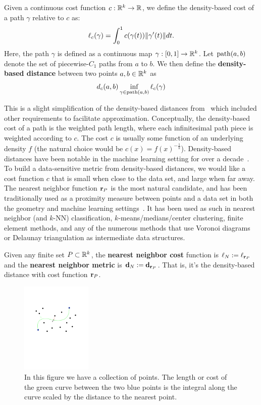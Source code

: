 \begin{definition}
Given a continuous cost function $c:\mathbb{R}^k \rightarrow \mathbb{R}$, we define the density-based
cost of a path $\gamma$ relative to $c$ as:
\[ \ell_c(\gamma) = \int_{0}^1 c(\gamma(t)) \| \gamma'(t) \|dt. \]
Here, the path $\gamma$ is defined as a continuous map $\gamma:[0,1]
\to \mathbb{R}^k$.
Let $\mathrm{path}(a,b)$ denote the set of piecewise-$C_1$ paths from $a$ to $b$.
We then define the \textbf{density-based distance} between two points $a, b \in
\mathbb{R}^k$ as
\[ d_c(a,b) \inf_{\gamma\in\mathrm{path}(a,b)} \ell_c(\gamma)\]
\end{definition}

This is a slight simplification of the density-based distances from~\cite{sajama05estimatingDBDM} which included other requirements to facilitate approximation.
Conceptually, the density-based cost of a path is the weighted path length,
where each infinitesimal path piece is weighted according to $c$.  The cost
$c$ is usually some function of an underlying density $f$ (the natural
choice would be $c(x) = f(x)^{-\frac{1}{k}}$).  Density-based distances
have been notable in the machine learning setting for over a
decade~\cite{sajama05estimatingDBDM,bijral11semiSupLearningDBD}.  To build
a data-sensitive metric from density-based distances, we would like a
cost function $c$ that is small when close to the data set, and large when
far away.  The nearest neighbor function $\mathbf{r}_P$ is the most natural
candidate, and has been traditionally used as a proximity measure between
points and a data set in both the geometry and machine learning
settings~\cite{bijral11semiSupLearningDBD}. It has been used as such in
nearest neighbor (and $k$-NN) classification, $k$-means/medians/center
clustering, finite element methods, and any of the numerous methods that
use Voronoi diagrams or Delaunay triangulation as intermediate data
structures.

\begin{definition} Given any finite set $P\subset \mathbb{R}^k$, the \textbf{nearest neighbor cost} function is $\ell_N := \ell_{\mathbf{r}_P}$ and the \textbf{nearest neighbor metric} is $\mathbf{d}_N := \mathbf{d}_{\mathbf{r}_P}$.  That is, it's the density-based distance with cost function $\mathbf{r}_P$.
\end{definition}
\begin{figure}[htbp]
  \centering
    \includegraphics[width=0.3\textwidth]{Figures/example.pdf}
    \caption{In this figure we have a collection of points.
      The length or cost of the green curve between the two blue points
      is the integral along the curve scaled by the distance to the nearest
point.}
  \label{fig:example}
\end{figure}

